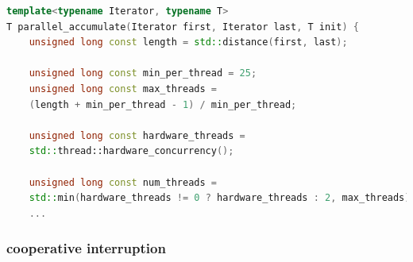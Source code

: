 \documentclass[a4paper,11pt,twoside]{book}
\begin{document}
\begin{itemize}
\begin{lstlisting}[frame=single, language=c++]
template<typename Iterator, typename T>
T parallel_accumulate(Iterator first, Iterator last, T init) {
	unsigned long const length = std::distance(first, last);
		
	unsigned long const min_per_thread = 25;
	unsigned long const max_threads =
	(length + min_per_thread - 1) / min_per_thread;
	
	unsigned long const hardware_threads =
	std::thread::hardware_concurrency();
	
	unsigned long const num_threads =
	std::min(hardware_threads != 0 ? hardware_threads : 2, max_threads);
	...
\end{lstlisting}	
	
	\end{itemize}

\subsubsection{cooperative interruption}
\end{document}
